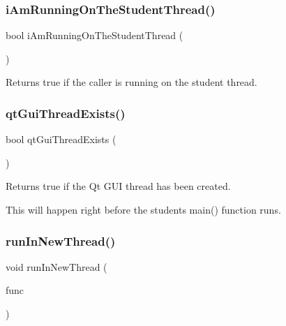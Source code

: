 \subsubsection{\texorpdfstring{i\+Am\+Running\+On\+The\+Student\+Thread()}{iAmRunningOnTheStudentThread()}}
{\footnotesize\ttfamily bool i\+Am\+Running\+On\+The\+Student\+Thread (\begin{DoxyParamCaption}{ }\end{DoxyParamCaption})\hspace{0.3cm}{\ttfamily [static]}}



Returns true if the caller is running on the student thread. 

\mbox{\label{classGThread_afee663b5d7998135c2aab0585b2ad37f}} 
\subsubsection{\texorpdfstring{qt\+Gui\+Thread\+Exists()}{qtGuiThreadExists()}}
{\footnotesize\ttfamily bool qt\+Gui\+Thread\+Exists (\begin{DoxyParamCaption}{ }\end{DoxyParamCaption})\hspace{0.3cm}{\ttfamily [static]}}



Returns true if the Qt G\+UI thread has been created. 

This will happen right before the student\textquotesingle{}s main() function runs. \mbox{\label{classGThread_ac9475674a195d39d457307b3e7365ddd}} 
\subsubsection{\texorpdfstring{run\+In\+New\+Thread()}{runInNewThread()}}
{\footnotesize\ttfamily void run\+In\+New\+Thread (\begin{DoxyParamCaption}\item[{G\+Thunk}]{func }\end{DoxyParamCaption})\hspace{0.3cm}{\ttfamily [static]}}



